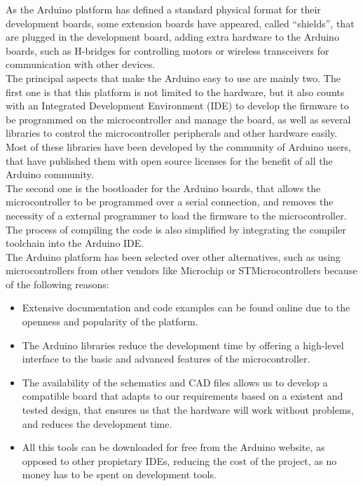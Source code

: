 As the Arduino platform has defined a standard physical format for their development boards, some extension boards have appeared, called ``shields'', that are plugged in the development board, adding extra hardware to the Arduino boards, such as H-bridges for controlling motors or wireless transceivers for communication with other devices.\\

The principal aspects that make the Arduino easy to use are mainly two. The first one is that this platform is not limited to the hardware, but it also counts with an Integrated Development Environment (IDE) to develop the firmware to be programmed on the microcontroller and manage the board, as well as several libraries to control the microcontroller peripherals and other hardware easily. Most of these libraries have been developed by the community of Arduino users, that have published them with open source licenses for the benefit of all the Arduino community.\\

The second one is the bootloader for the Arduino boards, that allows the microcontroller to be programmed over a serial connection, and removes the necessity of a external programmer to load the firmware to the microcontroller. The process of compiling the code is also simplified by integrating the compiler toolchain into the Arduino IDE.\\

The Arduino platform has been selected over other alternatives, such as using microcontrollers from other vendors like Microchip or STMicrocontrollers because of the following reasons:

\begin{itemize}
	\item Extensive documentation and code examples can be found online due to the openness and popularity of the platform.
	
	\item The Arduino libraries reduce the development time by offering a high-level interface to the basic and advanced features of the microcontroller.
	
	\item The availability of the schematics and CAD files allows us to develop a compatible board that adapts to our requirements based on a existent and tested design, that ensures us that the hardware will work without problems, and reduces the development time.
	
	\item All this tools can be downloaded for free from the Arduino website, as opposed to other propietary IDEs, reducing the cost of the project, as no money has to be spent on development tools. 
\end{itemize}


